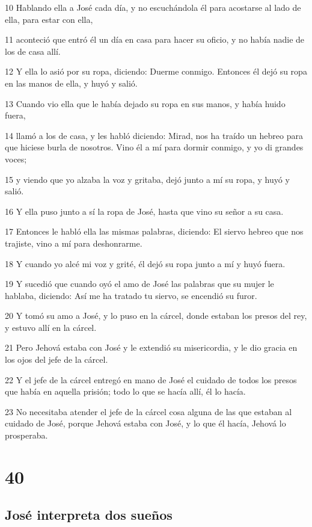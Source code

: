 10 Hablando ella a José cada día, y no escuchándola él para acostarse al lado de ella, para estar con ella,

11 aconteció que entró él un día en casa para hacer su oficio, y no había nadie de los de casa allí.

12 Y ella lo asió por su ropa, diciendo: Duerme conmigo. Entonces él dejó su ropa en las manos de ella, y huyó y salió.

13 Cuando vio ella que le había dejado su ropa en sus manos, y había huido fuera,

14 llamó a los de casa, y les habló diciendo: Mirad, nos ha traído un hebreo para que hiciese burla de nosotros. Vino él a mí para dormir conmigo, y yo di grandes voces;

15 y viendo que yo alzaba la voz y gritaba, dejó junto a mí su ropa, y huyó y salió.

16 Y ella puso junto a sí la ropa de José, hasta que vino su señor a su casa.

17 Entonces le habló ella las mismas palabras, diciendo: El siervo hebreo que nos trajiste, vino a mí para deshonrarme.

18 Y cuando yo alcé mi voz y grité, él dejó su ropa junto a mí y huyó fuera.

19 Y sucedió que cuando oyó el amo de José las palabras que su mujer le hablaba, diciendo: Así me ha tratado tu siervo, se encendió su furor.

20 Y tomó su amo a José, y lo puso en la cárcel, donde estaban los presos del rey, y estuvo allí en la cárcel.

21 Pero Jehová estaba con José y le extendió su misericordia, y le dio gracia en los ojos del jefe de la cárcel.

22 Y el jefe de la cárcel entregó en mano de José el cuidado de todos los presos que había en aquella prisión; todo lo que se hacía allí, él lo hacía.

23 No necesitaba atender el jefe de la cárcel cosa alguna de las que estaban al cuidado de José, porque Jehová estaba con José, y lo que él hacía, Jehová lo prosperaba.

\chapter{40}

\section{José interpreta dos sueños}

